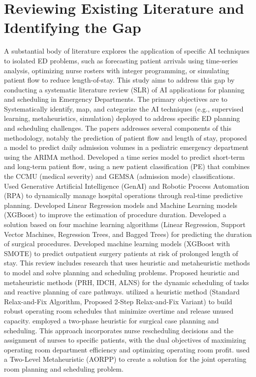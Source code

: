 \documentclass[runningheads]{llncs}
\begin{document}
\section{Reviewing Existing Literature and Identifying the Gap}
A substantial body of literature explores the application of specific AI techniques to isolated ED problems, such as forecasting patient arrivals using time-series analysis, optimizing nurse rosters with integer programming, or simulating patient flow to reduce length-of-stay.
This study aims to address this gap by conducting a systematic literature review (SLR) of AI applications for planning and scheduling in Emergency Departments. The primary objectives are to Systematically identify, map, and categorize the AI techniques (e.g., supervised learning, metaheuristics, simulation) deployed to address specific ED planning and scheduling challenges.
The papers  addresses several components of this methodology, notably the prediction of patient flow and length of stay, \cite{kadri2014ed} proposed a model to predict daily admission volumes in a pediatric emergency department using the ARIMA method. \cite{afilal2016edflow} Developed a time series model to predict short-term and long-term patient flow, using a new patient classification (PE) that combines the CCMU (medical severity) and GEMSA (admission mode) classifications. \cite{chennupati2025aira} Used Generative Artificial Intelligence (GenAI) and Robotic Process Automation (RPA) to dynamically manage hospital operations through real-time predictive planning. \cite{bartek2019ml} Developed Linear Regression models and Machine Learning models (XGBoost) to improve the estimation of procedure duration. \cite{martinez2021surgical} Developed a solution based on four machine learning algorithms (Linear Regression, Support Vector Machines, Regression Trees, and Bagged Trees) for predicting the duration of surgical procedures. \cite{jeffrey2023los} Developed machine learning models (XGBoost with SMOTE) to predict outpatient surgery patients at risk of prolonged length of stay. 
This review includes research that uses heuristic and metaheuristic methods to model and solve planning and scheduling problems. \cite{mezouari2023thesis} Proposed heuristic and metaheuristic methods (PRH, IDCH, ALNS) for the dynamic scheduling of tasks and reactive planning of care pathways. \cite{kroer2018or} utilized a heuristic method (Standard Relax-and-Fix Algorithm, Proposed 2-Step Relax-and-Fix Variant) to build robust operating room schedules that minimize overtime and release unused capacity. \cite{akbarzadeh2020or}  employed a two-phase heuristic for surgical case planning and scheduling. This approach incorporates nurse rescheduling decisions and the assignment of nurses to specific patients, with the dual objectives of maximizing operating room department efficiency and optimizing operating room profit. \cite{aringhieri2015metaheuristic} used a Two-Level Metaheuristic (AORPP) to create a solution for the joint operating room planning and scheduling problem.
\end{document}
